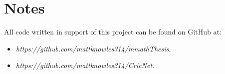\documentclass[11pt]{report}
\begin{document}
\section*{Notes}
All code written in support of this project can be found on GitHub at: \\
\begin{itemize}
    \item \textit{https://github.com/mattknowles314/mmathThesis}. 
    \item \textit{https://github.com/mattknowles314/CricNet}.
\end{itemize}


\setcounter{tocdepth}{3}
\tableofcontents
\setcounter{tocdepth}{1}
\listoffigures


















\appendix









{}
\end{document}
